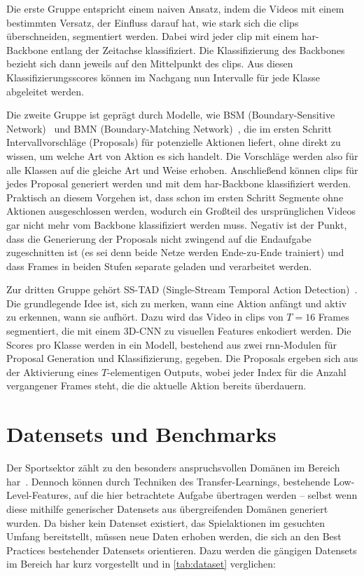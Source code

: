 Die erste Gruppe entspricht einem naiven Ansatz, indem die Videos mit einem bestimmten Versatz, der Einfluss darauf hat, wie stark sich die \glspl{clip} überschneiden, segmentiert werden.
Dabei wird jeder \gls{clip} mit einem \gls{har}-Backbone entlang der Zeitachse klassifiziert.
Die Klassifizierung des Backbones bezieht sich dann jeweils auf den Mittelpunkt des \glspl{clip}.
Aus diesen Klassifizierungsscores können im Nachgang nun Intervalle für jede Klasse abgeleitet werden.

Die zweite Gruppe ist geprägt durch Modelle, wie BSM (Boundary-Sensitive Network)~\cite{Lin18} und BMN (Boundary-Matching Network)~\cite{Lin19}, die im ersten Schritt Intervallvorschläge (Proposals) für potenzielle Aktionen liefert, ohne direkt zu wissen, um welche Art von Aktion es sich handelt.
Die Vorschläge werden also für alle Klassen auf die gleiche Art und Weise erhoben.
Anschließend können \glspl{clip} für jedes Proposal generiert werden und mit dem \gls{har}-Backbone klassifiziert werden.
Praktisch an diesem Vorgehen ist, dass schon im ersten Schritt Segmente ohne Aktionen ausgeschlossen werden, wodurch ein Großteil des ursprünglichen Videos gar nicht mehr vom Backbone klassifiziert werden muss.
Negativ ist der Punkt, dass die Generierung der Proposals nicht zwingend auf die Endaufgabe zugeschnitten ist (es sei denn beide Netze werden Ende-zu-Ende trainiert) und dass Frames in beiden Stufen separate geladen und verarbeitet werden.

Zur dritten Gruppe gehört \ua SS-TAD (Single-Stream Temporal Action Detection)~\cite{Buch17}.
Die grundlegende Idee ist, sich zu merken, wann eine Aktion anfängt und aktiv zu erkennen, wann sie aufhört.
Dazu wird das Video in \glspl{clip} von $T=16$ Frames segmentiert, die mit einem 3D-CNN zu visuellen Features enkodiert werden.
Die Scores pro Klasse werden in ein Modell, bestehend aus zwei \gls{rnn}-Modulen für Proposal Generation und Klassifizierung, gegeben.
Die Proposals ergeben sich aus der Aktivierung eines $T$-elementigen Outputs, wobei jeder Index für die Anzahl vergangener Frames steht, die die aktuelle Aktion bereits überdauern.

\section{Datensets und Benchmarks}
\label{sec:datensets-und-benchmarks}

Der Sportsektor zählt zu den besonders anspruchsvollen Domänen im Bereich \gls{har}~\cite{Sozykin17}.
Dennoch können durch Techniken des Transfer-Learnings, bestehende Low-Level-Features, auf die hier betrachtete Aufgabe übertragen werden -- selbst wenn diese mithilfe generischer Datensets aus übergreifenden Domänen generiert wurden.
Da bisher kein Datenset existiert, das Spielaktionen im gesuchten Umfang bereitstellt, müssen neue Daten erhoben werden, die sich an den Best Practices bestehender Datensets orientieren.
Dazu werden die gängigen Datensets im Bereich \gls{har} kurz vorgestellt und in \autoref{tab:dataset} verglichen:

